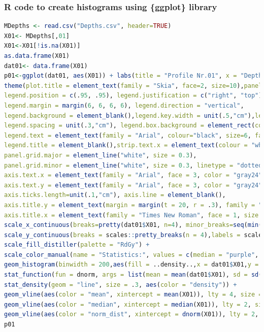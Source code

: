 \documentclass[pdflatex,compress,10pt,
	xcolor={dvipsnames,dvipsnames,svgnames,x11names,table},
	hyperref={colorlinks = true,breaklinks = true, urlcolor = NavyBlue, breaklinks = true}]{beamer}
\begin{document}
\begin{frame}[fragile,shrink=20]\frametitle{R code to create histograms using \{ggplot\} library}
\begin{lstlisting}[language=R]
MDepths <- read.csv("Depths.csv", header=TRUE)
X01<- MDepths[,01]
X01<-X01[!is.na(X01)]
as.data.frame(X01)
dat01<- data.frame(X01)
p01<-ggplot(dat01, aes(X01)) + labs(title = "Profile Nr.01", x = "Depths, m", y = "Density") +
theme(plot.title = element_text(family = "Skia", face=2, size=10),panel.background=ggplot2::element_rect(fill = "gray91"),
legend.position = c(.95, .95), legend.justification = c("right", "top"),  legend.box.just = "right",
legend.margin = margin(6, 6, 6, 6), legend.direction = "vertical", 
legend.background = element_blank(),legend.key.width = unit(.5,"cm"),legend.key.height = unit(.3,"cm"),
legend.spacing = unit(.3,"cm"), legend.box.background = element_rect(colour = "honeydew4",size=0.2),
legend.text = element_text(family = "Arial", colour="black", size=6, face=1),
legend.title = element_blank(),strip.text.x = element_text(colour = "white"),
panel.grid.major = element_line("white", size = 0.3),
panel.grid.minor = element_line("white", size = 0.3, linetype = "dotted"),
axis.text.x = element_text(family = "Arial", face = 3, color = "gray24",size = 5, angle = 0),
axis.text.y = element_text(family = "Arial", face = 3, color = "gray24",size = 4, angle = 90),
axis.ticks.length=unit(.1,"cm"), axis.line = element_blank(),
axis.title.y = element_text(margin = margin(t = 20, r = .3), family = "Times New Roman", face = 1, size = 6),
axis.title.x = element_text(family = "Times New Roman", face = 1, size = 6,margin = margin(t = .2))) +
scale_x_continuous(breaks=pretty(dat01$X01, n=4), minor_breaks=seq(min(dat01$X01), max(dat01$X01), by=500)) +
scale_y_continuous(breaks = scales::pretty_breaks(n = 4),labels = scales :: percent) +
scale_fill_distiller(palette = "RdGy") +
scale_color_manual(name = "Statistics:", values = c(median = "purple", mean = "green4",density = "blue", norm_dist = "black")) +
geom_histogram(binwidth = 200,aes(fill = ..density..,x = dat01$X01,y = ..density..),color = "blue",size = .1) +
stat_function(fun = dnorm, args = list(mean = mean(dat01$X01), sd = sd(dat01$X01)), lwd = 0.2, color = 'black') +
stat_density(geom = "line", size = .3, aes(color = "density")) +
geom_vline(aes(color = "mean", xintercept = mean(X01)), lty = 4, size = .3) +
geom_vline(aes(color = "median", xintercept = median(X01)), lty = 2, size = .3)  +
geom_vline(aes(color = "norm_dist", xintercept = dnorm(X01)), lty = 2, size = .3)
p01
\end{lstlisting}
\end{frame}
\end{document}
